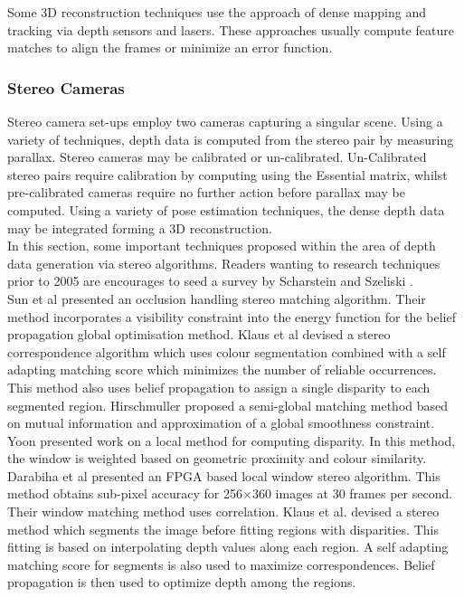 Some 3D reconstruction techniques use the approach of dense mapping and tracking via depth sensors and lasers. These approaches usually compute feature matches to align the frames or minimize an error function.


\subsubsection{Stereo Cameras}

\label{StereoMethodsSection}

Stereo camera set-ups employ two cameras capturing a singular scene. Using a variety of techniques, depth data is computed from the stereo pair by measuring parallax. Stereo cameras may be calibrated or un-calibrated. Un-Calibrated stereo pairs require calibration by computing using the Essential matrix, whilst pre-calibrated cameras require no further action before parallax may be computed. Using a variety of pose estimation techniques, the dense depth data may be integrated forming a 3D reconstruction. \\

In this section, some important techniques proposed within the area of depth data generation via stereo algorithms. Readers wanting to research techniques prior to 2005 are encourages to seed a survey by Scharstein and Szeliski \cite{Scharstein02Taxonomy}. \\


Sun et al \cite{Sun05Symmetric} presented an occlusion handling stereo matching algorithm. Their method incorporates a visibility constraint into the energy function for the belief propagation global optimisation method. Klaus et al \cite{Klaus06Segment} devised a stereo correspondence algorithm which uses colour segmentation combined with a self adapting matching score which minimizes the number of reliable occurrences. This method also uses belief propagation to assign a single disparity to each segmented region. Hirschmuller \cite{Hirschmuller05Accurate} proposed a semi-global matching method based on mutual information and approximation of a global smoothness constraint. \\

Yoon \cite{Yoon06Adaptive} presented work on a local method for computing disparity. In this method, the window is weighted based on geometric proximity and colour similarity. Darabiha et al \cite{Darabiha06Reconfigurable} presented an FPGA based local window stereo algorithm. This method obtains sub-pixel accuracy for 256$\times$360 images at 30 frames per second. Their window matching method uses correlation. Klaus et al. \cite{Klaus06Segment} devised a stereo method which segments the image before fitting regions with disparities. This fitting is based on interpolating depth values along each region. A self adapting matching score for segments is also used to maximize correspondences. Belief propagation is then used to optimize depth among the regions. \\


